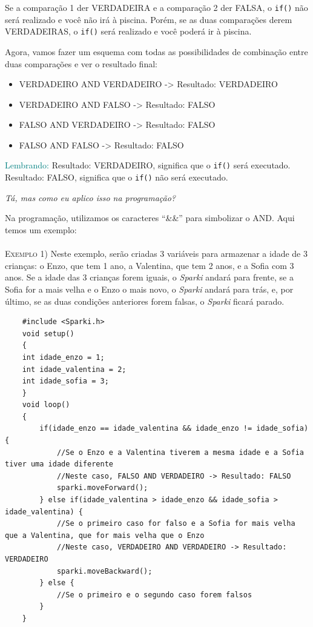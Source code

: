     Se a comparação 1 der VERDADEIRA e a comparação 2 der FALSA, o \texttt{if()} não será realizado e você não irá à piscina. Porém, se as duas comparações derem VERDADEIRAS, o \texttt{if()} será realizado e você poderá ir à piscina.
    
    Agora, vamos fazer um esquema com todas as possibilidades de combinação entre duas comparações e ver o resultado final:
    
    \begin{itemize}
        \item VERDADEIRO AND VERDADEIRO -> Resultado: VERDADEIRO
        \item VERDADEIRO AND FALSO -> Resultado: FALSO
        \item FALSO AND VERDADEIRO -> Resultado: FALSO
        \item FALSO AND FALSO -> Resultado: FALSO
    \end{itemize}
    
    \begin{center}
    \textcolor{teal}{Lembrando:}
    Resultado: VERDADEIRO, significa que o \texttt{if()} será executado. 
    Resultado: FALSO, significa que o \texttt{if()} não será executado.
    \end{center}
 
    \textit{Tá, mas como eu aplico isso na programação?}
        
    Na programação, utilizamos os caracteres ``\&\&'' para simbolizar o AND. Aqui temos um exemplo:
    \\
    \\
    \textsc{Exemplo 1)} Neste exemplo, serão criadas 3 variáveis para armazenar a idade de 3 crianças: o Enzo, que tem 1 ano, a Valentina, que tem 2 anos, e a Sofia com 3 anos. Se a idade das 3 crianças forem iguais, o \textsl{Sparki} andará para frente, se a Sofia for a mais velha e o Enzo o mais novo, o \textsl{Sparki} andará para trás, e, por último, se as duas condições anteriores forem falsas, o \textsl{Sparki} ficará parado.

    \begin{verbatim}
    #include <Sparki.h>
    void setup()
    {
    int idade_enzo = 1;
    int idade_valentina = 2;
    int idade_sofia = 3;
    }
    void loop()
    {
        if(idade_enzo == idade_valentina && idade_enzo != idade_sofia){
            //Se o Enzo e a Valentina tiverem a mesma idade e a Sofia tiver uma idade diferente
            //Neste caso, FALSO AND VERDADEIRO -> Resultado: FALSO
            sparki.moveForward();
        } else if(idade_valentina > idade_enzo && idade_sofia > idade_valentina) {
            //Se o primeiro caso for falso e a Sofia for mais velha que a Valentina, que for mais velha que o Enzo
            //Neste caso, VERDADEIRO AND VERDADEIRO -> Resultado: VERDADEIRO
            sparki.moveBackward();
        } else {
            //Se o primeiro e o segundo caso forem falsos
        }
    }
    \end{verbatim}
    
